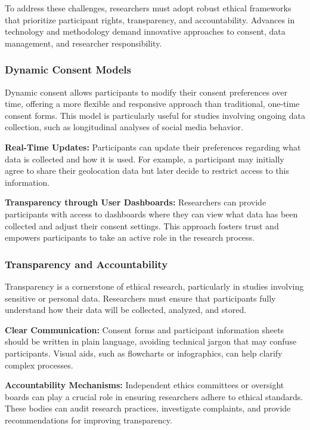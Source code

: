 \documentclass[
]{book}
\begin{document}
To address these challenges, researchers must adopt robust ethical frameworks that prioritize participant rights, transparency, and accountability. Advances in technology and methodology demand innovative approaches to consent, data management, and researcher responsibility.

\subsubsection*{Dynamic Consent Models}\label{dynamic-consent-models}

Dynamic consent allows participants to modify their consent preferences over time, offering a more flexible and responsive approach than traditional, one-time consent forms. This model is particularly useful for studies involving ongoing data collection, such as longitudinal analyses of social media behavior.

\textbf{Real-Time Updates:} Participants can update their preferences regarding what data is collected and how it is used. For example, a participant may initially agree to share their geolocation data but later decide to restrict access to this information.

\textbf{Transparency through User Dashboards:} Researchers can provide participants with access to dashboards where they can view what data has been collected and adjust their consent settings. This approach fosters trust and empowers participants to take an active role in the research process.

\subsubsection*{Transparency and Accountability}\label{transparency-and-accountability}

Transparency is a cornerstone of ethical research, particularly in studies involving sensitive or personal data. Researchers must ensure that participants fully understand how their data will be collected, analyzed, and stored.

\textbf{Clear Communication:} Consent forms and participant information sheets should be written in plain language, avoiding technical jargon that may confuse participants. Visual aids, such as flowcharts or infographics, can help clarify complex processes.

\textbf{Accountability Mechanisms:} Independent ethics committees or oversight boards can play a crucial role in ensuring researchers adhere to ethical standards. These bodies can audit research practices, investigate complaints, and provide recommendations for improving transparency.
\end{document}
